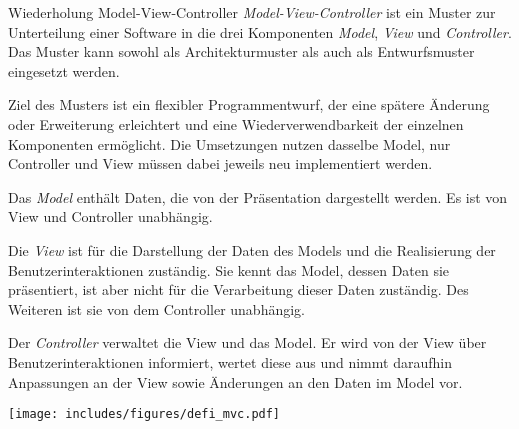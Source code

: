 \begin{bonus}{Wiederholung Model-View-Controller}
    \emph{Model-View-Controller}  ist ein Muster zur Unterteilung einer Software in die drei Komponenten \emph{Model}, \emph{View} und \emph{Controller}.
    Das Muster kann sowohl als Architekturmuster als auch als Entwurfsmuster eingesetzt werden.

    Ziel des Musters ist ein flexibler Programmentwurf, der eine spätere Änderung oder Erweiterung erleichtert und eine Wiederverwendbarkeit der einzelnen Komponenten ermöglicht.
    Die Umsetzungen nutzen dasselbe Model, nur Controller und View müssen dabei jeweils neu implementiert werden.

    Das \emph{Model} enthält Daten, die von der Präsentation dargestellt werden.
    Es ist von View und Controller unabhängig.

    Die \emph{View} ist für die Darstellung der Daten des Models und die Realisierung der Benutzerinteraktionen zuständig.
    Sie kennt das Model, dessen Daten sie präsentiert, ist aber nicht für die Verarbeitung dieser Daten zuständig.
    Des Weiteren ist sie von dem Controller unabhängig.

    Der \emph{Controller} verwaltet die View und das Model.
    Er wird von der View über Benutzerinteraktionen informiert, wertet diese aus und nimmt daraufhin Anpassungen an der View sowie Änderungen an den Daten im Model vor.

    \begin{center}
        \texttt{[image: includes/figures/defi\_mvc.pdf]}
    \end{center}
\end{bonus}

